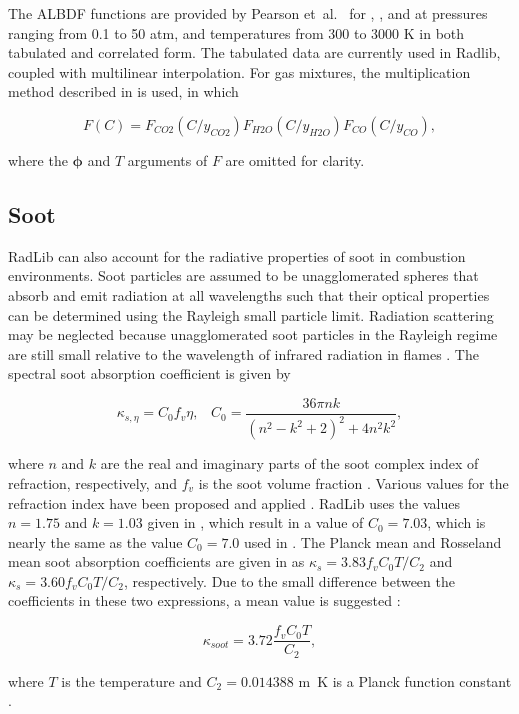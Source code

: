 \documentclass[preprint,12pt, a4paper]{elsarticle}
\newcommand{\BS}{\boldsymbol}
\begin{document}
The ALBDF functions are provided by Pearson et~al.~\cite{Pearson_2014} for , , and  at pressures ranging from 0.1 to 50 atm, and temperatures from 300 to 3000 K in both tabulated and correlated form. The tabulated data are currently used in Radlib, coupled with multilinear interpolation. For gas mixtures, the multiplication method described in \cite{Solovjov_2000} is used, in which 
%
\begin{linenomath}
\begin{equation}
    F(C) = F_{CO2}(C/y_{CO2})F_{H2O}(C/y_{H2O})F_{CO}(C/y_{CO}), 
\end{equation}
\end{linenomath}
%
where the $\BS{\phi}$ and $T$ arguments of $F$ are omitted for clarity.


\subsection{Soot} \label{s:soot}

RadLib can also account for the radiative properties of soot in combustion environments. Soot particles are assumed to be unagglomerated spheres that absorb and emit radiation at all wavelengths such that their optical properties can be determined using the Rayleigh small particle limit. Radiation scattering may be neglected because unagglomerated soot particles in the Rayleigh regime are still small relative to the wavelength of infrared radiation in flames \cite{Brewster_1992,Solovjov_2001}. The spectral soot absorption coefficient is given by 
%
\begin{linenomath}
\begin{equation}
\label{e:soot1}
	\kappa_{s,\eta}=C_0 f_v \eta, \; \; \; C_0 = \frac{36\pi n k}{(n^2-k^2+2)^2+4n^2k^2},
\end{equation}
\end{linenomath}
%
where $n$ and $k$ are the real and imaginary parts of the soot complex index of refraction, respectively, and $f_v$ is the soot volume fraction \cite{Solovjov_2001,Modest_2013}. Various values for the refraction index have been proposed and applied \cite{Lee_1981,Stull_1960,Dalzell_1969,Howarth_1966,Chang_1990,Felske_1984,Williams_2007}. 
RadLib uses the values $n=1.75$ and $k=1.03$ given in \cite{Williams_2007}, which result in a value of $C_0=7.03$, which is nearly the same as the value $C_0=7.0$ used in \cite{Solovjov_2001}. 
The Planck mean and Rosseland mean soot absorption coefficients are given in \cite{Modest_2013} as $\kappa_s=3.83f_vC_0T/C_2$ and $\kappa_s=3.60f_vC_0T/C_2$, respectively.
Due to the small difference between the coefficients in these two expressions, a mean value is suggested \cite{Felske_1977,Modest_2013}:
%
\begin{linenomath}
\begin{equation}
\label{e:soot2}
	\kappa_{soot}=3.72\frac{f_vC_0T}{C_2},
\end{equation}
\end{linenomath}
%
where $T$ is the temperature and $C_2=0.014388$ \si{m.K} is a Planck function constant \cite{Modest_2013}. 
\end{document}
